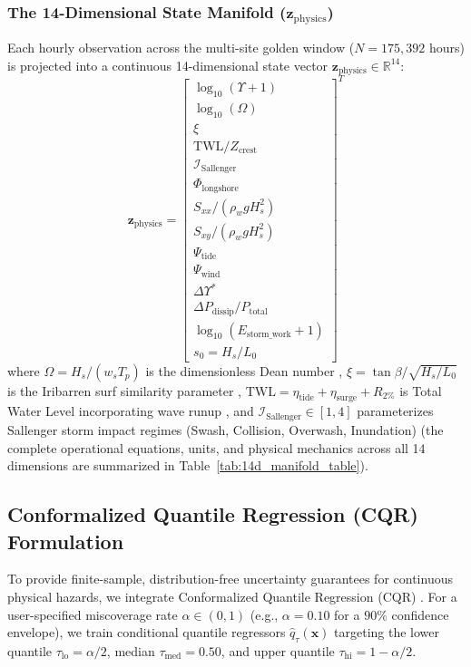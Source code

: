 \documentclass[journal]{IEEEtran}
\begin{document}
\subsubsection{The 14-Dimensional State Manifold \texorpdfstring{($\mathbf{z}_{\text{physics}}$)}{(z-physics)}}
Each hourly observation across the multi-site golden window ($N = 175,392$ hours) is projected into a continuous 14-dimensional state vector $\mathbf{z}_{\text{physics}} \in \mathbb{R}^{14}$:
\begin{equation}
\mathbf{z}_{\text{physics}} = \begin{bmatrix} 
\log_{10}(\Upsilon + 1) \\ 
\log_{10}(\Omega) \\ 
\xi \\ 
\text{TWL} / Z_{\text{crest}} \\ 
\mathcal{I}_{\text{Sallenger}} \\ 
\Phi_{\text{longshore}} \\ 
S_{xx} / (\rho_w g H_s^2) \\ 
S_{xy} / (\rho_w g H_s^2) \\ 
\Psi_{\text{tide}} \\ 
\Psi_{\text{wind}} \\ 
\Delta\Upsilon^* \\ 
\Delta P_{\text{dissip}} / P_{\text{total}} \\ 
\log_{10}(E_{\text{storm\_work}} + 1) \\ 
s_0 = H_s / L_0 
\end{bmatrix}^T
\label{eq:14d_manifold}
\end{equation}
where $\Omega = H_s / (w_s T_p)$ is the dimensionless Dean number \cite{wright1984morphodynamic}, $\xi = \tan\beta / \sqrt{H_s/L_0}$ is the Iribarren surf similarity parameter \cite{battjes1974surf}, $\text{TWL} = \eta_{\text{tide}} + \eta_{\text{surge}} + R_{2\%}$ is Total Water Level incorporating wave runup \cite{stockdon2006empirical}, and $\mathcal{I}_{\text{Sallenger}} \in [1, 4]$ parameterizes Sallenger storm impact regimes (Swash, Collision, Overwash, Inundation) \cite{sallenger2000storm} (the complete operational equations, units, and physical mechanics across all 14 dimensions are summarized in Table~\ref{tab:14d_manifold_table}).

\subsection{Conformalized Quantile Regression (CQR) Formulation}
To provide finite-sample, distribution-free uncertainty guarantees for continuous physical hazards, we integrate Conformalized Quantile Regression (CQR) \cite{vovk2005algorithmic,romano2019conformalized,angelopoulos2021gentle}. For a user-specified miscoverage rate $\alpha \in (0, 1)$ (e.g., $\alpha = 0.10$ for a $90\%$ confidence envelope), we train conditional quantile regressors $\hat{q}_{\tau}(\mathbf{x})$ targeting the lower quantile $\tau_{\text{lo}} = \alpha / 2$, median $\tau_{\text{med}} = 0.50$, and upper quantile $\tau_{\text{hi}} = 1 - \alpha / 2$.
\end{document}
